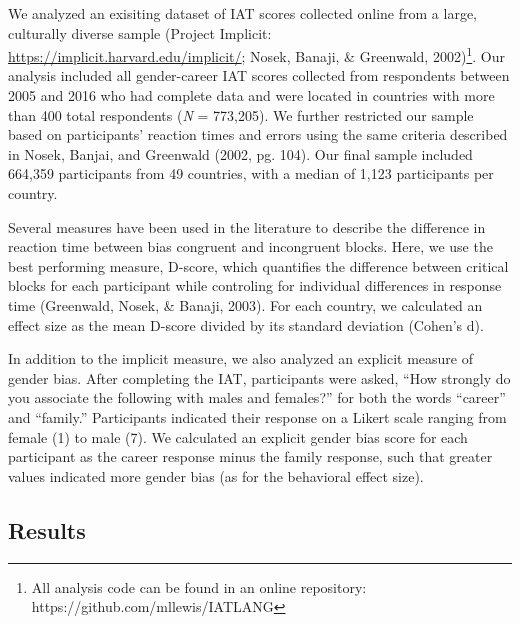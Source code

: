 \documentclass[10pt, letterpaper]{article}
\begin{document}
We analyzed an exisiting dataset of IAT scores collected online from a
large, culturally diverse sample (Project Implicit:
\url{https://implicit.harvard.edu/implicit/}; Nosek, Banaji, \&
Greenwald,
2002)\footnote{All analysis code can be found in an online repository: https://github.com/mllewis/IATLANG}.
Our analysis included all gender-career IAT scores collected from
respondents between 2005 and 2016 who had complete data and were located
in countries with more than 400 total respondents (\emph{N} = 773,205).
We further restricted our sample based on participants' reaction times
and errors using the same criteria described in Nosek, Banjai, and
Greenwald (2002, pg. 104). Our final sample included 664,359
participants from 49 countries, with a median of 1,123 participants per
country.

Several measures have been used in the literature to describe the
difference in reaction time between bias congruent and incongruent
blocks. Here, we use the best performing measure, D-score, which
quantifies the difference between critical blocks for each participant
while controling for individual differences in response time (Greenwald,
Nosek, \& Banaji, 2003). For each country, we calculated an effect size
as the mean D-score divided by its standard deviation (Cohen's d).

In addition to the implicit measure, we also analyzed an explicit
measure of gender bias. After completing the IAT, participants were
asked, ``How strongly do you associate the following with males and
females?'' for both the words ``career'' and ``family.'' Participants
indicated their response on a Likert scale ranging from female (1) to
male (7). We calculated an explicit gender bias score for each
participant as the career response minus the family response, such that
greater values indicated more gender bias (as for the behavioral effect
size).

\subsection{Results}\label{results}
\end{document}
